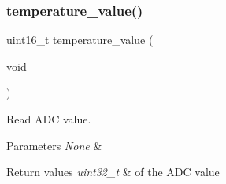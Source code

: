 \subsubsection{\texorpdfstring{temperature\+\_\+value()}{temperature\_value()}}
{\footnotesize\ttfamily uint16\+\_\+t temperature\+\_\+value (\begin{DoxyParamCaption}\item[{void}]{ }\end{DoxyParamCaption})}



Read A\+DC value. 


\begin{DoxyParams}{Parameters}
{\em None} & \\
\hline
\end{DoxyParams}

\begin{DoxyRetVals}{Return values}
{\em uint32\+\_\+t} & of the A\+DC value \\
\hline
\end{DoxyRetVals}

